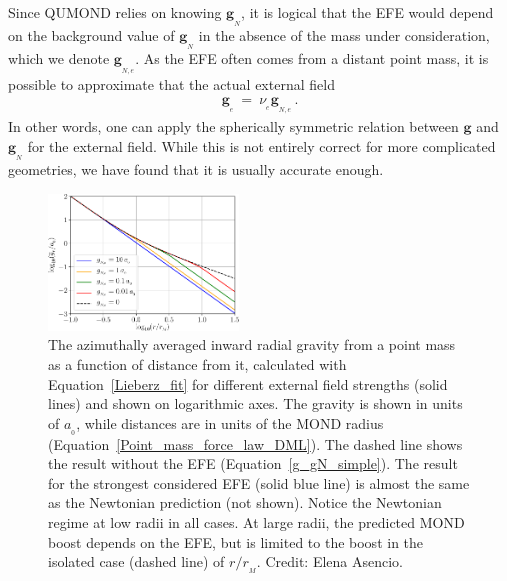 \documentclass[fleqn,usenatbib,useAMS]{mnras} %
\begin{document}
Since QUMOND relies on knowing $\bm{g}_{_N}$, it is logical that the EFE would depend on the background value of $\bm{g}_{_N}$ in the absence of the mass under consideration, which we denote $\bm{g}_{_{N,e}}$. As the EFE often comes from a distant point mass, it is possible to approximate that the actual external field
\begin{eqnarray}
	\bm{g}_{_e} ~=~ \nu_{_e} \bm{g}_{_{N,e}} \, .
\end{eqnarray}
In other words, one can apply the spherically symmetric relation between $\bm{g}$ and $\bm{g}_{_N}$ for the external field. While this is not entirely correct for more complicated geometries, we have found that it is usually accurate enough.

\begin{figure}
	\centering
	\includegraphics[width=0.45\textwidth]{Force_law_Lieberz}
	\caption{The azimuthally averaged inward radial gravity from a point mass as a function of distance from it, calculated with Equation~\ref{Lieberz_fit} for different external field strengths (solid lines) and shown on logarithmic axes. The gravity is shown in units of $a_{_0}$, while distances are in units of the MOND radius (Equation~\ref{Point_mass_force_law_DML}). The dashed line shows the result without the EFE (Equation~\ref{g_gN_simple}). The result for the strongest considered EFE (solid blue line) is almost the same as the Newtonian prediction (not shown). Notice the Newtonian regime at low radii in all cases. At large radii, the predicted MOND boost depends on the EFE, but is limited to the boost in the isolated case (dashed line) of $r/r_{_M}$. Credit: Elena Asencio.}
	\label{Force_law_Lieberz}
\end{figure}
\end{document}
